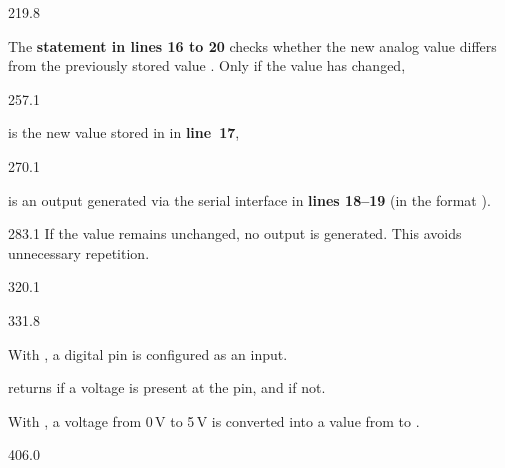 \documentclass{aslab}
\begin{document}
\begin{region}[pitch=12.65]{219.8}
\begin{dashlist}
\item The \textbf{ statement in lines 16 to 20} checks whether the
  new analog value  differs from the previously stored
  value . Only if the value has changed,
\end{dashlist}
\end{region}

\begin{region}[x=68.7,right=0]{257.1}
\begin{dashlist}
\item is the new value stored in  in \textbf{line~17},
\end{dashlist}
\end{region}

\begin{region}[x=68.7,right=0]{270.1}
\begin{dashlist}
\item is an output generated via the serial interface in
  \textbf{lines 18--19} (in the format ).
\end{dashlist}
\end{region}

\begin{region}[x=68.7,right=0]{283.1}
If the value remains unchanged, no output is generated. This avoids
unnecessary repetition.
\end{region}

\begin{region}{320.1}
\end{region}

\begin{region}[pitch=12.3,free]{331.8}
\begin{dashlist}
\item With , a digital pin is configured as an
  input.
\item {} returns  if a voltage is present at the
  pin, and  if not.
\item With , a voltage from 0\,V to 5\,V is converted
  into a value from  to .
\end{dashlist}
\end{region}

\begin{region}{406.0}
\end{region}
\end{document}
